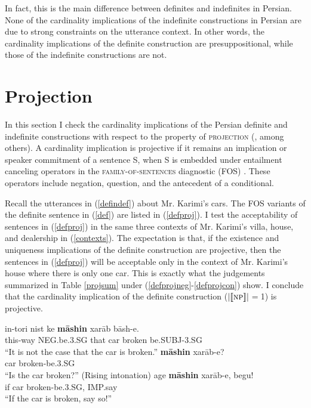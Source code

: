 \documentclass{salt}
\begin{document}
In fact, this is the main difference between definites and indefinites in Persian. None of the cardinality implications of the indefinite constructions in Persian are due to strong constraints on the utterance context. In other words, the cardinality implications of the definite construction are presuppositional, while those of the indefinite constructions are not. 

\section{Projection} \label {project}

In this section I check the cardinality implications of the Persian definite and indefinite constructions with respect to the property of \textsc{projection} (\citealt*{langendoenSavin, karttunen1973presuppositions, tonhauser2013toward}, among others). A cardinality implication is projective if it remains an implication or speaker commitment of a sentence S, when S is embedded under entailment canceling operators in the \textsc{family-of-sentences} diagnostic (FOS) \citep{chierchia1990meaning}. These operators include negation, question, and the antecedent of a conditional. 

Recall the utterances in (\ref{defindef}) about Mr. Karimi's cars. The FOS variants of the definite sentence in (\ref{def}) are listed in (\ref{defproj}). I test the acceptability of sentences in (\ref{defproj}) in the same three contexts of Mr. Karimi's villa, house, and dealership in (\ref{contexts}). The expectation is that, if the existence and uniqueness implications of the definite construction are projective, then the sentences in (\ref{defproj}) will be acceptable only in the context of Mr. Karimi's house where there is only one car. This is exactly what the judgements summarized in Table \ref{projsum} under (\ref{defprojneg}-\ref{defprojcon}) show. I conclude that the cardinality implication of the definite construction ($| \llbracket \textsc{np} \rrbracket |$$=$1) is projective.

	\begin {exe}
	\ex \label {defproj} \begin {xlist}
	\ex \label {defprojneg} 
		\gll	in-tori	nist		ke 	\textbf{m\={a}shin}	xar\={a}b b\={a}sh-e.\\
			this-way	{\scriptsize NEG}.be{\scriptsize .3.SG}	that car broken be{\scriptsize .SUBJ-3.SG}\\			
			``It is not the case that the car is broken.''
	\ex \label {defprojqu}
			\gll	\textbf{m\={a}shin}	xar\={a}b-e?\\
			car 	broken-be{\scriptsize .3.SG}\\
			``Is the car broken?'' (Rising intonation)
	\ex	\label {defprojcon}	
		\gll	age \textbf{m\={a}shin}	xar\={a}b-e, begu!\\
			if 	car broken-be{\scriptsize .3.SG}, {\scriptsize IMP}.say\\
			``If the car is broken, say so!''
	\end {xlist}
	\end {exe}
\end{document}
